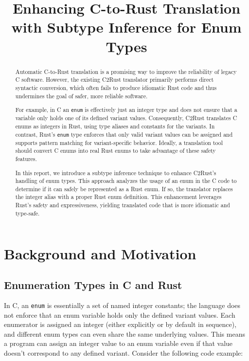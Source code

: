 \documentclass[peerreview, 10pt]{IEEEtran}
\begin{document}
\title{Enhancing C-to-Rust Translation with Subtype Inference for Enum Types}

\author{
}

\maketitle

\begin{abstract}
Automatic C-to-Rust translation is a promising way to improve the reliability of legacy C software. However, the existing C2Rust translator primarily performs direct syntactic conversion, which often fails to produce idiomatic Rust code and thus undermines the goal of safer, more reliable software.

For example, in C an \texttt{enum} is effectively just an integer type and does not ensure that a variable only holds one of its defined variant values. Consequently, C2Rust translates C enums as integers in Rust, using type aliases and constants for the variants. In contrast, Rust's \texttt{enum} type enforces that only valid variant values can be assigned and supports pattern matching for variant-specific behavior. Ideally, a translation tool should convert C enums into real Rust enums to take advantage of these safety features.

In this report, we introduce a subtype inference technique to enhance C2Rust's handling of enum types. This approach analyzes the usage of an enum in the C code to determine if it can safely be represented as a Rust enum. If so, the translator replaces the integer alias with a proper Rust enum definition. This enhancement leverages Rust's safety and expressiveness, yielding translated code that is more idiomatic and type-safe.
\end{abstract}

\section{Background and Motivation}

\subsection{Enumeration Types in C and Rust}
In C, an \texttt{enum} is essentially a set of named integer constants; the language does not enforce that an enum variable holds only the defined variant values. Each enumerator is assigned an integer (either explicitly or by default in sequence), and different enum types can even share the same underlying values. This means a program can assign an integer value to an enum variable even if that value doesn't correspond to any defined variant. Consider the following code example:
\end{document}
